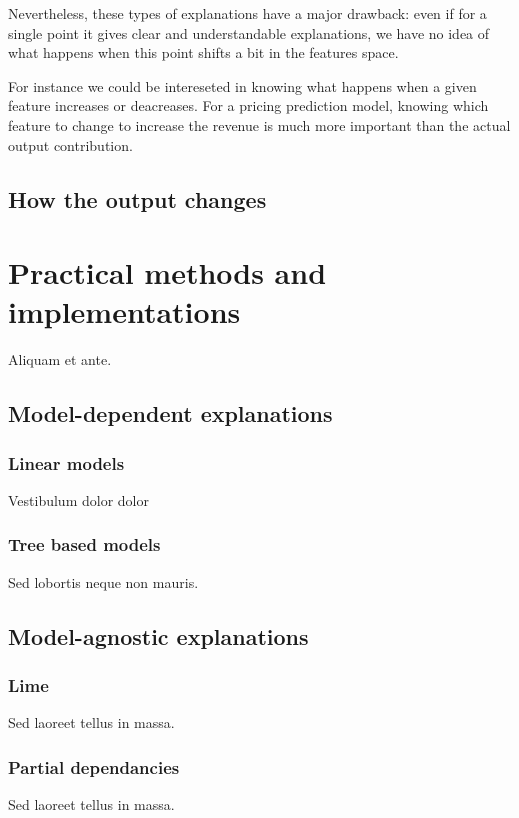 \documentclass[a4paper,11pt]{kth-mag}
\begin{document}
Nevertheless, these types of explanations have a major drawback: even if for a single point it gives clear and understandable explanations, we have no idea of what happens when this point shifts a bit in the features space.

For instance we could be intereseted in knowing what happens when a given feature increases or deacreases. For a pricing prediction model, knowing which feature to change to increase the revenue is much more important than the actual output contribution.

\section{How the output changes}

\chapter{Practical methods and implementations}

Aliquam et ante.

\section{Model-dependent explanations}

\subsection{Linear models}

Vestibulum dolor dolor

\subsection{Tree based models}

Sed lobortis neque non mauris.

\section{Model-agnostic explanations}

\subsection{Lime}
Sed laoreet tellus in massa.

\subsection{Partial dependancies}
Sed laoreet tellus in massa.
\end{document}
